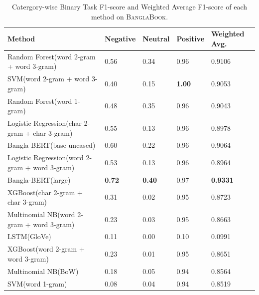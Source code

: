 \begin{table}[htbp]
\centering
\scriptsize
 \begin{tabular}{p{8.0cm} P{1.1cm} P{1.1cm} P{1.1cm} P{2.0cm}} 
\toprule \textbf{Method} & \textbf{Negative}  & \textbf{Neutral}  & \textbf{Positive}  & \textbf{Weighted Avg.}  \\ \midrule
Random Forest{\selectfont (word 2-gram + word 3-gram)} & 0.56 & 0.34 & 0.96 & 0.9106\\
SVM{\selectfont (word 2-gram + word 3-gram)} & 0.40 & 0.15 & \textbf{1.00} & 0.9053\\
Random Forest{\selectfont (word 1-gram)} & 0.48 & 0.35 & 0.96 & 0.9043\\
Logistic Regression{\selectfont (char 2-gram + char 3-gram)} & 0.55 & 0.13 & 0.96 & 0.8978\\
Bangla-BERT{\selectfont(base-uncased)} & 0.60 & 0.22 & 0.96 & 0.9064\\
Logistic Regression{\selectfont (word 2-gram + word 3-gram)} & 0.53 & 0.13 & 0.96 & 0.8964\\
Bangla-BERT{\selectfont (large)} & \textbf{0.72} & \textbf{0.40} & 0.97 & \textbf{0.9331}\\
\hdashline 
XGBoost{\selectfont (char 2-gram + char 3-gram)} & 0.31 & 0.02 & 0.95 & 0.8723\\
Multinomial NB{\selectfont (word 2-gram + word 3-gram)} & 0.23 & 0.03 & 0.95 & 0.8663\\
LSTM{\selectfont (GloVe)} & 0.11 & 0.00 & 0.10 & 0.0991\\
XGBoost{\selectfont (word 2-gram + word 3-gram)} & 0.23 & 0.01 & 0.95 & 0.8651\\
Multinomial NB{\selectfont (BoW)} & 0.18 & 0.05 & 0.94 & 0.8564\\
SVM{\selectfont (word 1-gram)} & 0.08 & 0.04 & 0.94 & 0.8519\\

\bottomrule
\end{tabular}
\caption{Catergory-wise Binary Task F1-score and Weighted Average F1-score of each method on \textsc{BanglaBook}.}\label{tab:baseline}
\end{table}





